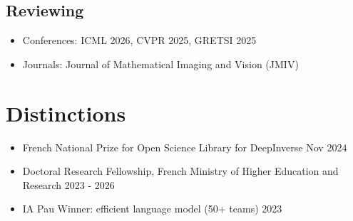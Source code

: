 \documentclass[a4paper,11pt]{article}
\begin{document}
\subsection*{Reviewing}
\begin{itemize}
    \item Conferences: ICML 2026, CVPR 2025, GRETSI 2025
    \item Journals: Journal of Mathematical Imaging and Vision (JMIV)
\end{itemize}

\section{Distinctions}
\begin{itemize}
	\item French National Prize for Open Science Library for DeepInverse \hfill Nov 2024
	\item Doctoral Research Fellowship, French Ministry of Higher Education and Research \hfill 2023 - 2026
	\item IA Pau Winner: efficient language model (50+ teams) \hfill 2023 
\end{itemize}
\end{document}
